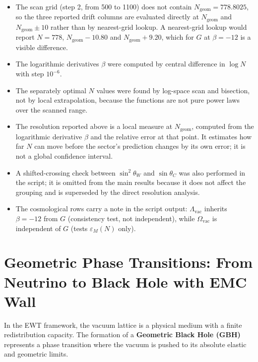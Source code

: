 \documentclass[10pt,a4paper]{article}
\begin{document}
\begin{itemize}
	\item The scan grid (step 2, from 500 to 1100) does not contain
	$N_{\text{geom}} = 778.8025$, so the three reported drift columns are
	evaluated directly at $N_{\text{geom}}$ and
	$N_{\text{geom}} \pm 10$ rather than by nearest-grid lookup. A
	nearest-grid lookup would report $N = 778$, $N_{\text{geom}} - 10.80$
	and $N_{\text{geom}} + 9.20$, which for $G$ at $\beta = -12$ is a
	visible difference.
	\item The logarithmic derivatives $\beta$ were computed by central
	difference in $\log N$ with step $10^{-6}$.
	\item The separately optimal $N$ values were found by log-space scan
	and bisection, not by local extrapolation, because the functions are
	not pure power laws over the scanned range.
	\item The resolution reported above is a local measure at
	$N_{\text{geom}}$, computed from the logarithmic derivative $\beta$
	and the relative error at that point. It estimates how far $N$ can
	move before the sector's prediction changes by its own error; it is
	not a global confidence interval.
	\item A shifted-crossing check between $\sin^2\theta_W$ and
	$\sin\theta_C$ was also performed in the script; it is omitted from
	the main results because it does not affect the grouping and is
	superseded by the direct resolution analysis.
	\item The cosmological rows carry a note in the script output:
	$\Lambda_{\text{vac}}$ inherits $\beta = -12$ from $G$ (consistency
	test, not independent), while $\Omega_{\text{vac}}$ is independent
	of $G$ (tests $\varepsilon_M(N)$ only).
\end{itemize}


\section{Geometric Phase Transitions: From Neutrino to Black Hole with EMC Wall}
\label{sec:gbh_neutrinos}

In the EWT framework, the vacuum lattice is a physical medium with a finite redistribution capacity. The formation of a \textbf{Geometric Black Hole (GBH)} represents a phase transition where the vacuum is pushed to its absolute elastic and geometric limits.
\end{document}
